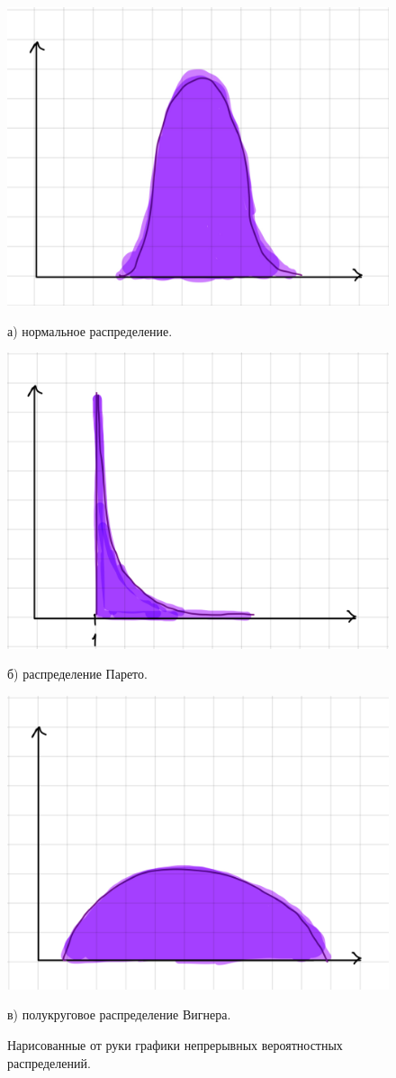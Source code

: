 \documentclass[14pt, russian]{scrartcl}
\begin{document}
\begin{figure}[H]
	\centering
	\begin{minipage}[t]{.35\textwidth}
		\centering
		\includegraphics[width=0.7\linewidth]{./img/norm_2.jpg}
		\caption*{а) нормальное распределение.}
	\end{minipage}
	\noindent
	\begin{minipage}[t]{.35\textwidth}
		\centering
		\includegraphics[width=0.7\linewidth]{./img/pareto_2.jpg}
		\caption*{б) распределение Парето.}
	\end{minipage}
	\begin{minipage}[t]{.35\textwidth}
		\centering
		\includegraphics[width=0.7\linewidth]{./img/vigner_2.jpg}
		\caption*{в) полукруговое распределение Вигнера.}
	\end{minipage}
	\caption{Нарисованные от руки графики непрерывных вероятностных распределений.}
	\label{fig:hand2}
\end{figure}
\end{document}
